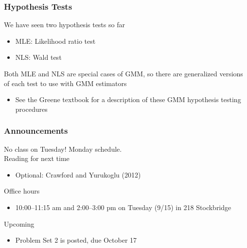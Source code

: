 \documentclass{beamer}
\begin{document}
\begin{frame}\frametitle{Hypothesis Tests}
    We have seen two hypothesis tests so far
    \begin{itemize}
    	\item MLE: Likelihood ratio test
    	\item NLS: Wald test
    \end{itemize}
    \vspace{2ex}
    Both MLE and NLS are special cases of GMM, so there are generalized versions of each test to use with GMM estimators
    \begin{itemize}
    	\item See the Greene textbook for a description of these GMM hypothesis testing procedures
    \end{itemize}
\end{frame}

\begin{frame}\frametitle{Announcements}
	No class on Tuesday! Monday schedule. \\
	\vspace{3ex}
    Reading for next time
    \begin{itemize}
        \item Optional: Crawford and Yurukoglu (2012)
    \end{itemize}
    \vspace{3ex}
    Office hours
    \begin{itemize}
    	\item 10:00--11:15 am and 2:00--3:00 pm on Tuesday (9/15) in 218 Stockbridge
    \end{itemize}
    \vspace{3ex}
    Upcoming
    \begin{itemize}
        \item Problem Set 2 is posted, due October 17
    \end{itemize}
\end{frame}
\end{document}
